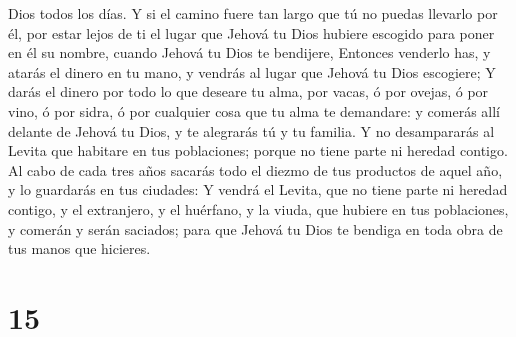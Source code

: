 Dios todos los días.  Y si el camino fuere tan largo que tú
no puedas llevarlo por él, por estar lejos de ti el lugar que Jehová tu
Dios hubiere escogido para poner en él su nombre, cuando Jehová tu Dios
te bendijere,  Entonces venderlo has, y atarás el dinero en
tu mano, y vendrás al lugar que Jehová tu Dios escogiere; 
Y darás el dinero por todo lo que deseare tu alma, por vacas, ó por
ovejas, ó por vino, ó por sidra, ó por cualquier cosa que tu alma te
demandare: y comerás allí delante de Jehová tu Dios, y te alegrarás tú y
tu familia.  Y no desampararás al Levita que habitare en
tus poblaciones; porque no tiene parte ni heredad contigo. 
Al cabo de cada tres años sacarás todo el diezmo de tus productos de
aquel año, y lo guardarás en tus ciudades:  Y vendrá el
Levita, que no tiene parte ni heredad contigo, y el extranjero, y el
huérfano, y la viuda, que hubiere en tus poblaciones, y comerán y serán
saciados; para que Jehová tu Dios te bendiga en toda obra de tus manos
que hicieres.

\hypertarget{section-14}{%
\section{15}\label{section-14}}

